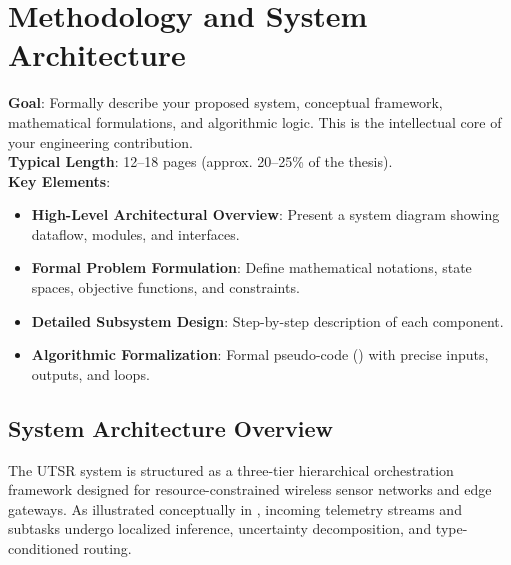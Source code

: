 
\chapter{Methodology and System Architecture}
\label{ch:methodology}

\begin{takeawaybox}
\textbf{Goal}: Formally describe your proposed system, conceptual framework, mathematical formulations, and algorithmic logic. This is the intellectual core of your engineering contribution.\\
\textbf{Typical Length}: 12--18 pages (approx. 20--25\% of the thesis).\\
\textbf{Key Elements}:
\begin{itemize}[leftmargin=*]
    \item \textbf{High-Level Architectural Overview}: Present a system diagram showing dataflow, modules, and interfaces.
    \item \textbf{Formal Problem Formulation}: Define mathematical notations, state spaces, objective functions, and constraints.
    \item \textbf{Detailed Subsystem Design}: Step-by-step description of each component.
    \item \textbf{Algorithmic Formalization}: Formal pseudo-code () with precise inputs, outputs, and loops.
\end{itemize}
\end{takeawaybox}

\section{System Architecture Overview}
\label{sec:method_overview}

The \ac{UTSR} system is structured as a three-tier hierarchical orchestration framework designed for resource-constrained wireless sensor networks and edge gateways. As illustrated conceptually in , incoming telemetry streams and subtasks undergo localized inference, uncertainty decomposition, and type-conditioned routing.


